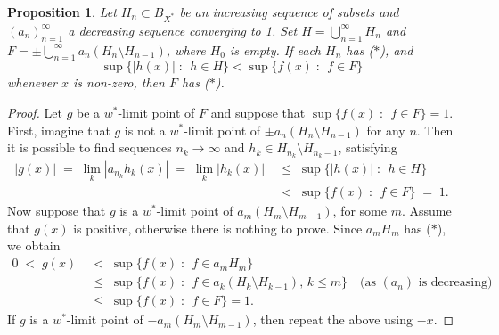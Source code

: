\documentclass[12pt,a4paper]{amsart}
\newtheorem{proposition}[theorem]{Proposition}
\theoremstyle{definition}
\theoremstyle{remark}
\newcommand{\set}[2]{\{{#1} \;:\;\, {#2}\}}
\newcommand{\st}{($*$)}
\begin{document}
\begin{proposition}\label{prop4ext}
Let $H_n \subset B_{X^*}$ be an increasing sequence of subsets and
$(a_n)_{n=1}^\infty$ a decreasing sequence converging to 1. Set
$H = \bigcup_{n=1}^\infty H_n$ and $F = \pm\bigcup_{n=1}^\infty a_n
(H_n\setminus H_{n-1})$, where $H_0$ is empty. If each $H_n$ has {\st}, and
\[
\sup\set{|h(x)|}{h \in H} < \sup\set{f(x)}{f \in F}
\]
whenever $x$ is non-zero, then $F$ has {\st}.
\end{proposition}

\begin{proof}
Let $g$ be a $w^*$-limit point of $F$ and suppose that
$\sup\set{f(x)}{f \in F}=1$. First, imagine that $g$ is not a
$w^*$-limit point of $\pm a_n (H_n\setminus H_{n-1})$ for any $n$.
Then it is possible to find sequences $n_k \to \infty$ and
$h_k \in H_{n_k}\setminus H_{{n_k}-1}$,
satisfying
\begin{align*}
|g(x)| \;=\; \lim_k |a_{n_k}h_k(x)| \;=\; \lim_k |h_k(x)| &\;\leq\; \sup\set{|h(x)|}{h \in H}\\
&\;<\; \sup\set{f(x)}{f \in F} \;=\; 1.
\end{align*}
Now suppose that $g$ is a $w^*$-limit point of $a_m (H_m\setminus H_{m-1})$,
for some $m$. Assume that $g(x)$ is positive, otherwise there is
nothing to prove. Since $a_m H_m$ has
{\st}, we obtain
\begin{align*}
0 \;<\; g(x) &\;<\; \sup\set{f(x)}{f \in a_m H_m} \\
&\;\leq\; \sup\set{f(x)}{f \in a_k(H_k\setminus H_{k-1}),\, k \leq m}\quad \text{(as $(a_n)$ is decreasing)} \\
&\;\leq\; \sup\set{f(x)}{f \in F} = 1.
\end{align*}
If $g$ is a $w^*$-limit point of $-a_m (H_m\setminus H_{m-1})$, then repeat the
above using $-x$.
\end{proof}
\end{document}
